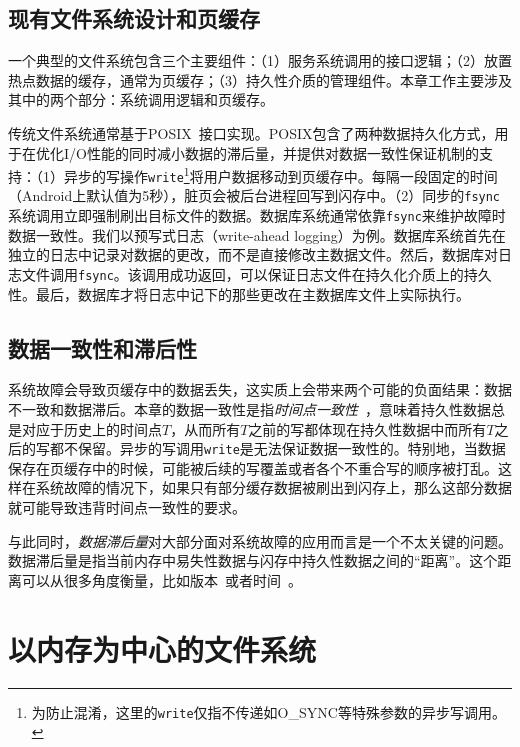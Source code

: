 \subsection{现有文件系统设计和页缓存}

一个典型的文件系统包含三个主要组件：（1）服务系统调用的接口逻辑；（2）放置热点数据的缓存，通常为页缓存；（3）持久性介质的管理组件。本章工作主要涉及其中的两个部分：系统调用逻辑和页缓存。

传统文件系统通常基于POSIX~\cite{POSIX}接口实现。POSIX包含了两种数据持久化方式，用于在优化I/O性能的同时减小数据的滞后量，并提供对数据一致性保证机制的支持：（1）异步的写操作\texttt{write}\footnote{为防止混淆，这里的\texttt{write}仅指不传递如O\_SYNC等特殊参数的异步写调用。}将用户数据移动到页缓存中。每隔一段固定的时间（Android上默认值为5秒），脏页会被后台进程回写到闪存中。（2）同步的\texttt{fsync}系统调用立即强制刷出目标文件的数据。数据库系统通常依靠\texttt{fsync}来维护故障时数据一致性。我们以预写式日志（write-ahead logging）为例。数据库系统首先在独立的日志中记录对数据的更改，而不是直接修改主数据文件。然后，数据库对日志文件调用\texttt{fsync}。该调用成功返回，可以保证日志文件在持久化介质上的持久性。最后，数据库才将日志中记下的那些更改在主数据库文件上实际执行。

\subsection{数据一致性和滞后性}

系统故障会导致页缓存中的数据丢失，这实质上会带来两个可能的负面结果：数据不一致和数据滞后。本章的数据一致性是指\emph{时间点一致性}~\cite{point-in-time-consist}，意味着持久性数据总是对应于历史上的时间点$T$，从而所有$T$之前的写都体现在持久性数据中而所有$T$之后的写都不保留。异步的写调用\texttt{write}是无法保证数据一致性的。特别地，当数据保存在页缓存中的时候，可能被后续的写覆盖或者各个不重合写的顺序被打乱。这样在系统故障的情况下，如果只有部分缓存数据被刷出到闪存上，那么这部分数据就可能导致违背时间点一致性的要求。

与此同时，\emph{数据滞后量}对大部分面对系统故障的应用而言是一个不太关键的问题。数据滞后量是指当前内存中易失性数据与闪存中持久性数据之间的“距离”。这个距离可以从很多角度衡量，比如版本~\cite{Bailis:2012:PBS:2212351.2212359}或者时间~\cite{Ports:2010:TCA:1924943.1924963}。

\section{以内存为中心的文件系统}

